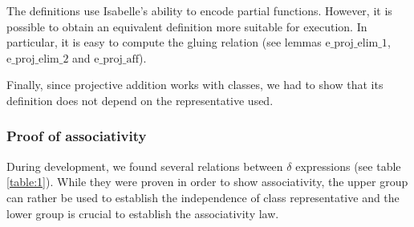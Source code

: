 \documentclass{llncs}
\begin{document}

The definitions use Isabelle's ability to encode partial
functions. However, it is possible to obtain an equivalent definition
more suitable for execution. In particular, it is easy to compute the
gluing relation (see lemmas $\text{e\_proj\_elim\_1}$,
$\text{e\_proj\_elim\_2}$ and $\text{e\_proj\_aff}$).

Finally, since projective addition works with classes, we had to show
that its definition does not depend on the representative used.


\subsubsection{Proof of associativity}

During development, we found several relations between $\delta$
expressions (see table \ref{table:1}). While they were proven in order
to show associativity, the upper group can rather be used to establish
the independence of class representative and the lower group is
crucial to establish the associativity law.
\end{document}
